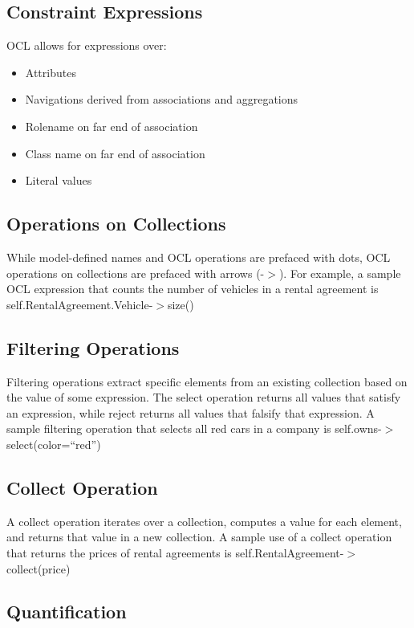 \documentclass[12pt,titlepage]{article}
\begin{document}
    \subsection{Constraint Expressions}
      OCL allows for expressions over:
      \begin{itemize}
        \item Attributes
        \item Navigations derived from associations and aggregations
        \item Rolename on far end of association
        \item Class name on far end of association
        \item Literal values
      \end{itemize}

    \subsection{Operations on Collections}
      While model-defined names and OCL operations are prefaced with dots, OCL operations on collections are prefaced with arrows (-$>$).
      For example, a sample OCL expression that counts the number of vehicles in a rental agreement is self.RentalAgreement.Vehicle-$>$size()

    \subsection{Filtering Operations}
      Filtering operations extract specific elements from an existing collection based on the value of some expression. The select operation
      returns all values that satisfy an expression, while reject returns all values that falsify that expression. A sample filtering operation
      that selects all red cars in a company is self.owns-$>$select(color=``red'')

    \subsection{Collect Operation}
      A collect operation iterates over a collection, computes a value for each element, and returns that value in a new collection. A sample
      use of a collect operation that returns the prices of rental agreements is self.RentalAgreement-$>$collect(price)

    \subsection{Quantification}
\end{document}
